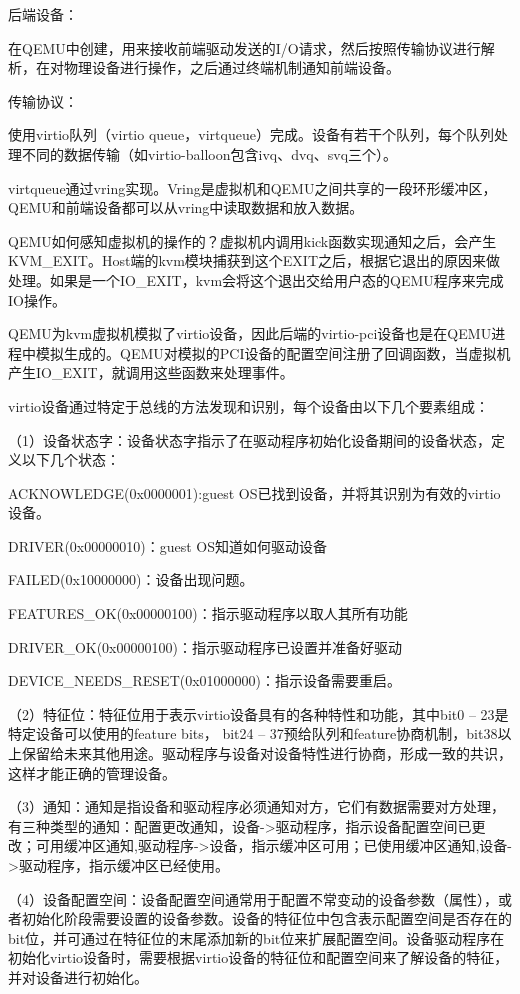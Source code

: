 后端设备：

在QEMU中创建，用来接收前端驱动发送的I/O请求，然后按照传输协议进行解析，在对物理设备进行操作，之后通过终端机制通知前端设备。

传输协议：

使用virtio队列（virtio queue，virtqueue）完成。设备有若干个队列，每个队列处理不同的数据传输（如virtio-balloon包含ivq、dvq、svq三个）。

virtqueue通过vring实现。Vring是虚拟机和QEMU之间共享的一段环形缓冲区，QEMU和前端设备都可以从vring中读取数据和放入数据。

QEMU如何感知虚拟机的操作的？虚拟机内调用kick函数实现通知之后，会产生KVM_EXIT。Host端的kvm模块捕获到这个EXIT之后，根据它退出的原因来做处理。如果是一个IO_EXIT，kvm会将这个退出交给用户态的QEMU程序来完成IO操作。

QEMU为kvm虚拟机模拟了virtio设备，因此后端的virtio-pci设备也是在QEMU进程中模拟生成的。QEMU对模拟的PCI设备的配置空间注册了回调函数，当虚拟机产生IO_EXIT，就调用这些函数来处理事件。

virtio设备通过特定于总线的方法发现和识别，每个设备由以下几个要素组成：

（1）设备状态字：设备状态字指示了在驱动程序初始化设备期间的设备状态，定义以下几个状态：

ACKNOWLEDGE(0x0000001):guest OS已找到设备，并将其识别为有效的virtio设备。

DRIVER(0x00000010)：guest OS知道如何驱动设备

FAILED(0x10000000)：设备出现问题。

FEATURES_OK(0x00000100)：指示驱动程序以取人其所有功能

DRIVER_OK(0x00000100)：指示驱动程序已设置并准备好驱动

DEVICE_NEEDS_RESET(0x01000000)：指示设备需要重启。

（2）特征位：特征位用于表示virtio设备具有的各种特性和功能，其中bit0 – 23是特定设备可以使用的feature bits， bit24 – 37预给队列和feature协商机制，bit38以上保留给未来其他用途。驱动程序与设备对设备特性进行协商，形成一致的共识，这样才能正确的管理设备。

（3）通知：通知是指设备和驱动程序必须通知对方，它们有数据需要对方处理，有三种类型的通知：配置更改通知，设备->驱动程序，指示设备配置空间已更改；可用缓冲区通知,驱动程序->设备，指示缓冲区可用；已使用缓冲区通知,设备->驱动程序，指示缓冲区已经使用。

（4）设备配置空间：设备配置空间通常用于配置不常变动的设备参数（属性），或者初始化阶段需要设置的设备参数。设备的特征位中包含表示配置空间是否存在的bit位，并可通过在特征位的末尾添加新的bit位来扩展配置空间。设备驱动程序在初始化virtio设备时，需要根据virtio设备的特征位和配置空间来了解设备的特征，并对设备进行初始化。

